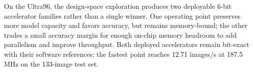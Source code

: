 On the Ultra96, the design-space exploration produces two deployable 6-bit
accelerator families rather than a single winner. One operating point preserves
more model capacity and favors accuracy, but remains memory-bound; the other
trades a small accuracy margin for enough on-chip memory headroom to add
parallelism and improve throughput. Both deployed accelerators remain bit-exact
with their software references; the fastest point reaches 12.71 images/s at
187.5\,MHz on the 133-image test set.
